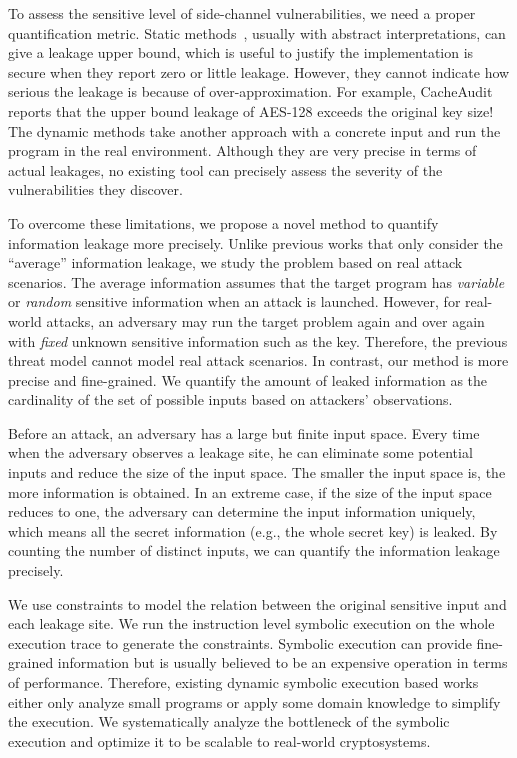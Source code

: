 To assess the sensitive level of side-channel vulnerabilities, we need a proper
quantification metric. Static methods~\cite{182946,5207642}, usually with
abstract interpretations, can give a leakage upper bound, which is useful to
justify the implementation is secure when they report zero or little leakage.
However, they cannot indicate how serious the leakage is because of
over-approximation. For example, CacheAudit~\cite{182946} reports that the upper
bound leakage of AES-128 exceeds the original key size! The dynamic methods take
another approach with a concrete input and run the program in the real
environment. Although they are very precise in terms of actual leakages, no
existing tool can precisely assess the severity of the vulnerabilities they
discover. 

To overcome these limitations, we propose a novel method to quantify information
leakage more precisely. Unlike previous works that only consider the
``average'' information leakage, we study the problem based on real attack
scenarios. The average information assumes that the target program has
\emph{variable} or \emph{random} sensitive information when an attack is
launched. However, for real-world attacks, an adversary may run the target
problem again and over again with \emph{fixed} unknown sensitive information
such as the key. Therefore, the previous threat model cannot model real attack
scenarios. In contrast, our method is more precise and fine-grained. We quantify
the amount of leaked information as the cardinality of the set of possible
inputs based on attackers' observations.


Before an attack, an adversary has a large but finite input space. Every time
when the adversary observes a leakage site, he can eliminate some potential
inputs and reduce the size of the input space. The smaller the input space is,
the more information is obtained. In an extreme case, if the size of the
input space reduces to one, the adversary can determine the input information
uniquely, which means all the secret information (e.g., the whole secret key) is
leaked. By counting the number of distinct inputs, we can quantify the
information leakage precisely.

We use constraints to model the relation between the original sensitive input
and each leakage site. We run the instruction level symbolic execution on the
whole execution trace to generate the constraints. Symbolic execution can
provide fine-grained information but is usually believed to be an expensive
operation in terms of performance. Therefore, existing dynamic symbolic
execution based works~\cite{203878,236338,Brotzman19Casym} either only analyze
small programs or apply some domain knowledge to simplify the execution. We
systematically analyze the bottleneck of the symbolic execution and optimize it
to be scalable to real-world cryptosystems.

